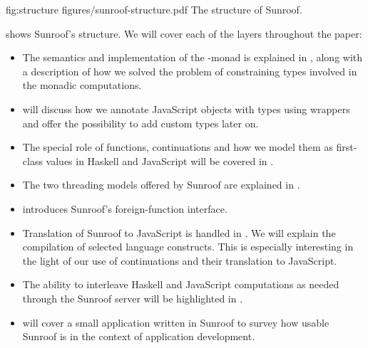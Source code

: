 \Figure%
{fig:structure}%
{figures/sunroof-structure.pdf}%
{The structure of Sunroof.}

 shows Sunroof's structure.
We will cover each of the layers throughout the paper:
\begin{itemize}
\item
The semantics and implementation of the \JS-monad is explained 
in , along with a description of how
we solved
the problem of constraining types involved in the monadic 
computations.
\item
{} will discuss how we annotate 
JavaScript objects with types using wrappers 
and offer the possibility to add custom types later on.
\item
The special role of functions, continuations and
how we model them as first-class values in Haskell and JavaScript
will be covered in .
\item
The two threading models offered by Sunroof are explained 
in .
\item
{} introduces Sunroof's foreign-function interface.
\item
Translation of Sunroof to JavaScript is handled in 
. We will explain the 
compilation of selected language constructs. This is 
especially interesting in the light of our use of continuations
and their translation to JavaScript.
\item
The ability to interleave Haskell and JavaScript computations as needed
through the Sunroof server will be highlighted in .
\item
{} will cover a small application 
written in Sunroof to survey how usable Sunroof is in the 
context of application development. 
\end{itemize}

